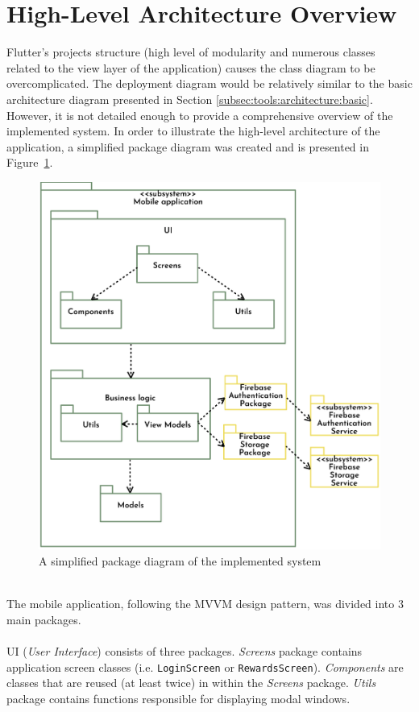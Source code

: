 \section{High-Level Architecture Overview}\label{sec:implementation:architecture}
Flutter's projects structure (high level of modularity and numerous classes related to the view layer of the application) causes the class diagram to be overcomplicated. The deployment diagram would be relatively similar to the basic architecture diagram presented in Section \ref{subsec:tools:architecture:basic}. However, it is not detailed enough to provide a comprehensive overview of the implemented system. In order to illustrate the high-level architecture of the application, a simplified package diagram was created and is presented in Figure~\ref{fig:diagrams:package-diagram}.
\\
\begin{figure}[htb]
\centering
\includegraphics[width=.9\linewidth]{images/diagrams/package-diagram.png}
\caption{A simplified package diagram of the implemented system}
\label{fig:diagrams:package-diagram}
\end{figure}
\\
The mobile application, following the MVVM design pattern, was divided into 3 main packages.
\\\\
UI (\textit{User Interface}) consists of three packages. \textit{Screens} package contains application screen classes (i.e. \texttt{LoginScreen} or \texttt{RewardsScreen}). \textit{Components} are classes that are reused (at least twice) in within the \textit{Screens} package. \textit{Utils} package contains functions responsible for displaying modal windows.
